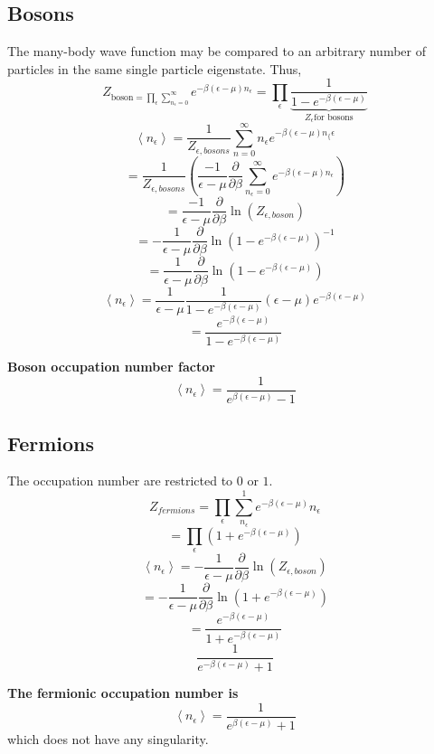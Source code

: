 \documentclass[11pt]{book}
\theoremstyle{definition}
\begin{document}
\subsection{Bosons}
The many-body wave function may be compared to an arbitrary number of particles in the same single particle eigenstate. Thus,
\[ Z_{\text{boson} = \prod_{\epsilon} \sum_{n_{\epsilon}=0}^{\infty}} 
	e^{-\beta (\epsilon-\mu)n_{\epsilon}} = \prod_{\epsilon} 
	\underbrace{\frac{1}{1- e^{-\beta(\epsilon-\mu)}}}_{Z_{\epsilon}\text{for bosons}}
\] 
\[ \left \langle n_\epsilon \right \rangle = \frac{1}{Z_{\epsilon, bosons}} \sum_{n=0}^{\infty} n_{\epsilon} e^{-\beta(\epsilon-\mu)n_\{\epsilon}\] 
\[ = \frac{1}{Z_{\epsilon, bosons}} 
\left( \frac{-1}{\epsilon-\mu}\frac{\partial }{\partial \beta} \sum_{n_{\epsilon}=0}^{\infty}e^{-\beta(\epsilon-\mu)n_{\epsilon}} \right) \] 
\[ = \frac{-1}{\epsilon-\mu}\frac{\partial }{\partial \beta} \ln(Z_{\epsilon,boson})  \] 
\[ = -\frac{1}{\epsilon-\mu} \frac{\partial }{\partial \beta} 
\ln(1-e^{-\beta(\epsilon-\mu)})^{-1}\] 
\[ = \frac{1}{\epsilon-\mu} \frac{\partial }{\partial \beta} \ln(1-e^{-\beta(\epsilon-\mu)}) \] 
\[ \left \langle n_{\epsilon} \right \rangle = \frac{1}{\epsilon-\mu}\frac{1}{1-e^{-\beta(\epsilon-\mu)}} 
(\epsilon-\mu) e^{-\beta(\epsilon-\mu)}\] 
\[ = \frac{e^{-\beta(\epsilon-\mu)}}{1-e^{-\beta(\epsilon-\mu)}} \] 
\begin{shaded*}
\textbf{Boson occupation number factor} 
\[ \left \langle n_{\epsilon} \right \rangle = \frac{1}{e^{\beta(\epsilon-\mu)}-1} \] 
\end{shaded*}
\subsection{Fermions}
The occupation number are restricted to $ 0 $ or $ 1 $.
\[ Z_{fermions} = \prod_{\epsilon} \sum_{n_{\epsilon}}^{1}e^{-\beta(\epsilon-\mu)}n_{\epsilon}\] 
\[ = \prod_{\epsilon} \left( 1+e^{-\beta(\epsilon-\mu)} \right)  \] 
\[ \left \langle n_{\epsilon} \right \rangle = -\frac{1}{\epsilon-\mu}  \frac{\partial }{\partial \beta} \ln(Z_{\epsilon,boson}) \] 
\[ = -\frac{1}{\epsilon-\mu} \frac{\partial }{\partial \beta} \ln(1+e^{-\beta (\epsilon-\mu)})  \] 
\[ = \frac{e^{-\beta(\epsilon-\mu)}}{1+e^{-\beta(\epsilon-\mu)}} \] 
\[ \frac{1}{e^{-\beta(\epsilon-\mu)}+1} \] 
\begin{shaded*}
\textbf{The fermionic occupation number is}
\[ \left \langle n_{\epsilon} \right \rangle = \frac{1}{e^{\beta(\epsilon-\mu)}+1} \] 
which does not have any singularity.
\end{shaded*}
\end{document}
